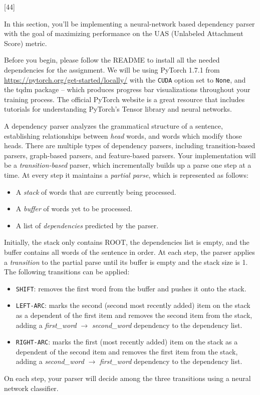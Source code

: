 [44]

In this section, you'll be implementing a neural-network based dependency parser with the goal of maximizing performance on the UAS (Unlabeled Attachment Score) metric.\newline

Before you begin, please follow the README to install all the needed dependencies for the assignment. We will be using PyTorch 1.7.1 from \url{https://pytorch.org/get-started/locally/} with the \texttt{CUDA} option set to \texttt{None}, and the tqdm package -- which produces progress bar visualizations throughout your training process. The official PyTorch website is a great resource that includes tutorials for understanding PyTorch's Tensor library and neural networks. \newline

A dependency parser analyzes the grammatical structure of a sentence, establishing relationships between \textit{head} words, and words which modify those heads. There are multiple types of dependency parsers, including transition-based parsers, graph-based parsers, and feature-based parsers. Your implementation will be a {\it transition-based} parser, which incrementally builds up a parse one step at a time. At every step it maintains a \textit{partial parse}, which is represented as follows:
\begin{itemize}
    \item A {\it stack} of words that are currently being processed.
    \item A {\it buffer} of words yet to be processed.
    \item A list of {\it dependencies} predicted by the parser.
\end{itemize}
Initially, the stack only contains ROOT, the dependencies list is empty, and the buffer contains all words of the sentence in order. At each step, the parser applies a {\it transition} to the partial parse until its buffer is empty and the stack size is 1. The following transitions can be applied:
\begin{itemize}
    \item \texttt{SHIFT}: removes the first word from the buffer and pushes it onto the stack.
    \item \texttt{LEFT-ARC}: marks the second (second most recently added) item on the stack as a dependent of the first item and removes the second item from the stack, adding a \textit{first\_word} $\rightarrow$ \textit{second\_word} dependency to the dependency list.
    \item \texttt{RIGHT-ARC}: marks the first (most recently added) item on the stack as a dependent of the second item and removes the first item from the stack, adding a \textit{second\_word} $\rightarrow$ \textit{first\_word} dependency to the dependency list.
\end{itemize}
On each step, your parser will decide among the three transitions using a neural network classifier.

